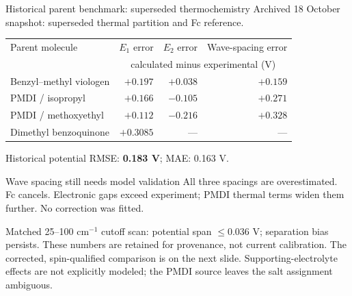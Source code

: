 \begin{frame}{Historical parent benchmark: superseded thermochemistry}
\footnotesize
Archived 18 October snapshot: superseded thermal partition and Fc reference.
\medskip\par\centering
\begin{tabular}{lrrr}
\toprule
Parent molecule & $E_1$ error & $E_2$ error & Wave-spacing error \\
 & \multicolumn{3}{c}{calculated minus experimental (V)} \\
\midrule
Benzyl--methyl viologen & $+0.197$ & $+0.038$ & $+0.159$ \\
PMDI / isopropyl & $+0.166$ & $-0.105$ & $+0.271$ \\
PMDI / methoxyethyl & $+0.112$ & $-0.216$ & $+0.328$ \\
Dimethyl benzoquinone & $+0.3085$ & --- & --- \\
\bottomrule
\end{tabular}\par\raggedright
\medskip
Historical potential RMSE: \textbf{0.183 V}; MAE: 0.163 V.
\begin{block}{Wave spacing still needs model validation}
All three spacings are overestimated. Fc cancels. Electronic gaps exceed
experiment; PMDI thermal terms widen them further. No correction was fitted.
\end{block}
\footnotesize Matched 25--100 cm$^{-1}$ cutoff scan: potential span $\leq$0.036 V; separation bias persists.
\vfill\scriptsize These numbers are retained for provenance, not current calibration.
The corrected, spin-qualified comparison is on the next slide. Supporting-electrolyte effects are not
explicitly modeled; the PMDI source leaves the salt assignment ambiguous.
\end{frame}
